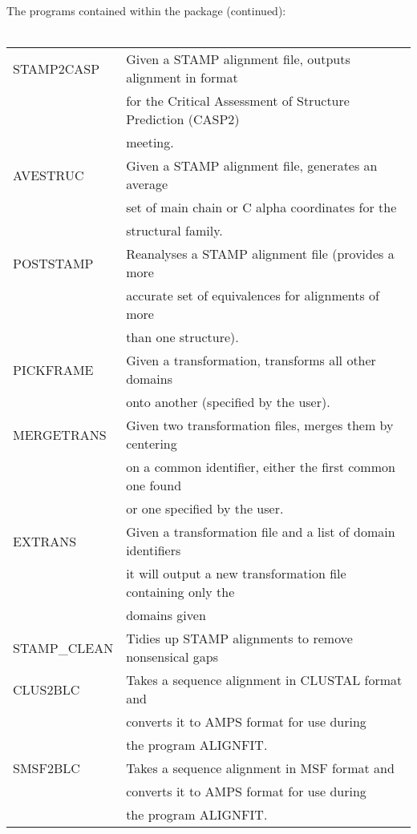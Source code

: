 \newpage
The programs contained within the package (continued):\\
\\
\begin{center}
\begin{tabular}{|ll|}
\hline
STAMP2CASP & Given a STAMP alignment file, outputs alignment in format\\
	   &  for the Critical Assessment of Structure Prediction (CASP2)\\
           &  meeting.\\
\hline
AVESTRUC & Given a STAMP alignment file, generates an average\\
         &    set of main chain or C alpha coordinates for the \\
         &    structural family.\\
\hline
POSTSTAMP & Reanalyses a STAMP alignment file (provides a more\\
          &   accurate set of equivalences for alignments of more\\
          &   than one structure).\\
\hline
PICKFRAME & Given a transformation, transforms all other domains \\ 
          &   onto another (specified by the user).\\
\hline
MERGETRANS & Given two transformation files, merges them by centering \\
           &  on a common identifier, either the first common one found\\
           &  or one specified by the user.\\
\hline
EXTRANS    & Given a transformation file and a list of domain identifiers \\
           &  it will output a new transformation file containing only the \\
           &  domains given \\
\hline
STAMP\_CLEAN & Tidies up STAMP alignments to remove nonsensical gaps\\
\hline
CLUS2BLC & Takes a sequence alignment in CLUSTAL format and \\
	    &    converts it to AMPS format for use during\\
         &    the program ALIGNFIT.\\
\hline
SMSF2BLC  & Takes a sequence alignment in MSF format and \\
         &    converts it to AMPS format for use during\\
         &    the program ALIGNFIT.\\
\hline
\end{tabular}
\end{center}

